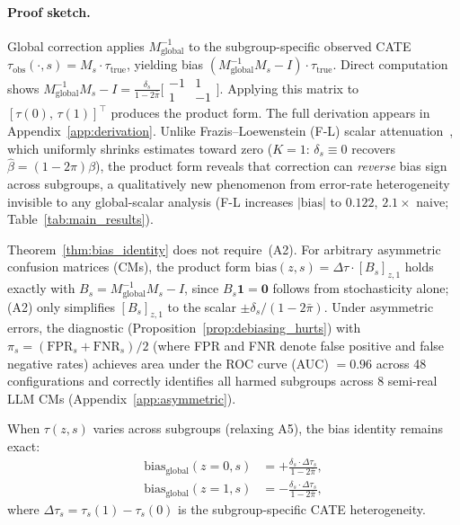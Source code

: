 \paragraph{Proof sketch.}
Global correction applies $M_{\text{global}}^{-1}$ to the subgroup-specific observed CATE $\tau_{\text{obs}}(\cdot, s) = M_s \cdot \tau_{\text{true}}$, yielding bias $(M_{\text{global}}^{-1} M_s - I) \cdot \tau_{\text{true}}$.
Direct computation shows $M_{\text{global}}^{-1} M_s - I = \frac{\delta_s}{1-2\bar{\pi}} \bigl[\begin{smallmatrix} -1 & 1 \\ 1 & -1 \end{smallmatrix}\bigr]$.
Applying this matrix to $[\tau(0),\, \tau(1)]^\top$ produces the product form.
The full derivation appears in Appendix~\ref{app:derivation}.
Unlike Frazis--Loewenstein (F-L) scalar attenuation~\citep{frazis2003estimating}, which uniformly shrinks estimates toward zero ($K{=}1$: $\delta_s \equiv 0$ recovers $\hat{\beta} = (1-2\pi)\beta$), the product form reveals that correction can \emph{reverse} bias sign across subgroups, a qualitatively new phenomenon from error-rate heterogeneity invisible to any global-scalar analysis (F-L increases $|\text{bias}|$ to $0.122$, $2.1\times$ naive; Table~\ref{tab:main_results}).

\begin{remark}
\label{rem:asymmetric}
Theorem~\ref{thm:bias_identity} does not require~(A2).
For arbitrary asymmetric confusion matrices (CMs), the product form $\mathrm{bias}(z, s) = \Delta\tau \cdot [B_s]_{z,1}$ holds exactly with $B_s = M_{\mathrm{global}}^{-1} M_s - I$, since $B_s \mathbf{1} = \mathbf{0}$ follows from stochasticity alone; (A2) only simplifies $[B_s]_{z,1}$ to the scalar $\pm \delta_s / (1{-}2\bar{\pi})$.
Under asymmetric errors, the diagnostic (Proposition~\ref{prop:debiasing_hurts}) with $\pi_s = (\mathrm{FPR}_s + \mathrm{FNR}_s)/2$ (where FPR and FNR denote false positive and false negative rates) achieves area under the ROC curve (AUC) $= 0.96$ across 48 configurations and correctly identifies all harmed subgroups across 8 semi-real LLM CMs (Appendix~\ref{app:asymmetric}).
\end{remark}

\begin{proposition}
\label{prop:a5_relaxation}
When $\tau(z, s)$ varies across subgroups (relaxing A5), the bias identity remains exact:
\begin{align}
\mathrm{bias}_{\mathrm{global}}(z{=}0, s) &= +\frac{\delta_s \cdot \Delta\tau_s}{1 - 2\bar{\pi}}, \label{eq:hetero_z0} \\
\mathrm{bias}_{\mathrm{global}}(z{=}1, s) &= -\frac{\delta_s \cdot \Delta\tau_s}{1 - 2\bar{\pi}}, \label{eq:hetero_z1}
\end{align}
where $\Delta\tau_s = \tau_s(1) - \tau_s(0)$ is the subgroup-specific CATE heterogeneity.
\end{proposition}

